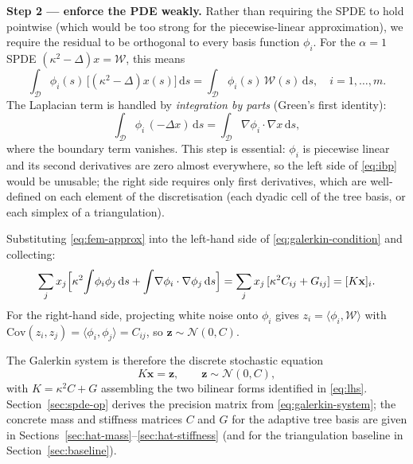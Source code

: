 \documentclass[11pt]{article}
\newcommand{\dd}{\,\mathrm{d}}
\begin{document}
\textbf{Step 2 --- enforce the PDE weakly.}  Rather than requiring the SPDE
to hold pointwise (which would be too strong for the piecewise-linear
approximation), we require the residual to be orthogonal to every basis
function $\phi_i$.  For the $\alpha=1$ SPDE
$(\kappa^2-\Delta)x=\mathcal{W}$, this means
\begin{equation}
  \int_\mathcal{D} \phi_i(s)\,\bigl[(\kappa^2-\Delta)x(s)\bigr]\dd s
  = \int_\mathcal{D} \phi_i(s)\,\mathcal{W}(s)\dd s, \quad i=1,\ldots,m.
  \label{eq:galerkin-condition}
\end{equation}
The Laplacian term is handled by \emph{integration by parts}
(Green's first identity):
\begin{equation}
  \int_\mathcal{D} \phi_i\,(-\Delta x)\dd s
  = \int_\mathcal{D} \nabla\phi_i\cdot\nabla x\dd s,
  \label{eq:ibp}
\end{equation}
where the boundary term vanishes.  This step is essential: $\phi_i$ is
piecewise linear and its second derivatives are zero almost everywhere, so the
left side of \eqref{eq:ibp} would be unusable; the right side requires only
first derivatives, which are well-defined on each element of the discretisation
(each dyadic cell of the tree basis, or each simplex of a triangulation).

Substituting \eqref{eq:fem-approx} into the left-hand side of
\eqref{eq:galerkin-condition} and collecting:
\begin{equation}
  \sum_j x_j \Bigl[\kappa^2\!\int\!\phi_i\phi_j\dd s
                  +\int\!\nabla\phi_i\cdot\nabla\phi_j\dd s\Bigr]
  = \sum_j x_j\,[\kappa^2 C_{ij} + G_{ij}]
  = [K\mathbf{x}]_i.
  \label{eq:lhs}
\end{equation}
For the right-hand side, projecting white noise onto $\phi_i$ gives
$z_i = \langle\phi_i,\mathcal{W}\rangle$ with
$\mathrm{Cov}(z_i,z_j)=\langle\phi_i,\phi_j\rangle=C_{ij}$,
so $\mathbf{z}\sim\mathcal{N}(0,C)$.

The Galerkin system is therefore the discrete stochastic equation
\begin{equation}
  K\mathbf{x} = \mathbf{z}, \qquad \mathbf{z}\sim\mathcal{N}(0,C),
  \label{eq:galerkin-system}
\end{equation}
with $K=\kappa^2 C+G$ assembling the two bilinear forms identified in
\eqref{eq:lhs}.  Section~\ref{sec:spde-op} derives the precision matrix from
\eqref{eq:galerkin-system}; the concrete mass and stiffness matrices $C$ and $G$
for the adaptive tree basis are given in
Sections~\ref{sec:hat-mass}--\ref{sec:hat-stiffness}
(and for the triangulation baseline in Section~\ref{sec:baseline}).
\end{document}
